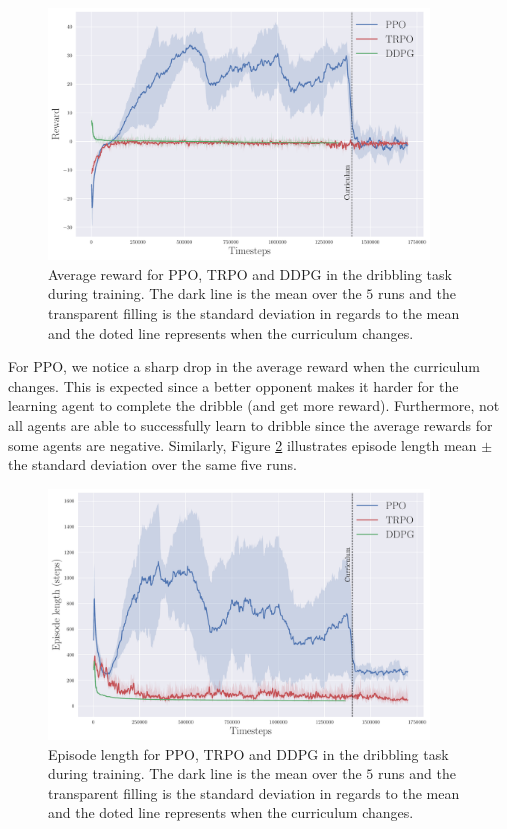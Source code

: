 \begin{figure}[h]
	\centering
	\includegraphics[width=0.9\textwidth]{Chapter7/dribbling/Reward.pdf}
	\caption{Average reward for PPO, TRPO and DDPG in the dribbling task during training.
	The dark line is the mean over the $5$ runs and the transparent filling is
	 the standard deviation in regards to the mean and the doted line represents when the curriculum changes.}
	\label{fig:dribbling_episode_rew}
\end{figure}

For PPO, we notice a sharp drop in the average reward when the curriculum changes.
This is expected since a better opponent makes it harder for the learning agent to complete the dribble
(and get more reward). Furthermore, not all agents are able to successfully learn to dribble since the 
average rewards for some agents are negative.
Similarly, Figure \ref{fig:dribbling_episode_len} illustrates episode length mean $\pm$ the standard deviation
over the same five runs.

\begin{figure}[h]
	\centering
	\includegraphics[width=0.9\textwidth]{Chapter7/dribbling/Episodelength(steps).pdf}
	\caption{Episode length for PPO, TRPO and DDPG in the dribbling task during training.
	The dark line is the mean over the $5$ runs and the transparent filling is
	the standard deviation in regards to the mean and the doted line represents when the curriculum changes.}
	\label{fig:dribbling_episode_len}
\end{figure}


